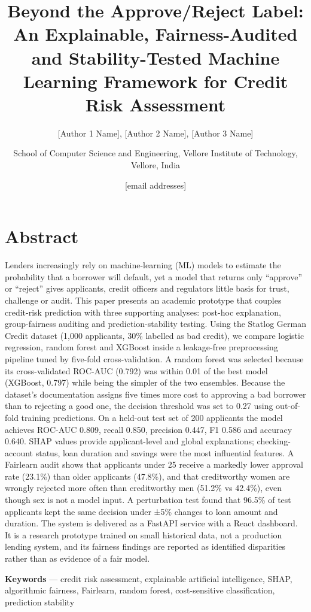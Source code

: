 \documentclass[
  11pt,
]{article}
\title{Beyond the Approve/Reject Label: An Explainable, Fairness-Audited
and Stability-Tested Machine Learning Framework for Credit Risk
Assessment}
\author{{[}Author 1 Name{]}, {[}Author 2 Name{]}, {[}Author 3
Name{]} \and School of Computer Science and Engineering, Vellore
Institute of Technology, Vellore, India \and {[}email addresses{]}}
\date{}
\begin{document}
\maketitle

\hypertarget{abstract}{%
\section{Abstract}\label{abstract}}

Lenders increasingly rely on machine-learning (ML) models to estimate
the probability that a borrower will default, yet a model that returns
only ``approve'' or ``reject'' gives applicants, credit officers and
regulators little basis for trust, challenge or audit. This paper
presents an academic prototype that couples credit-risk prediction with
three supporting analyses: post-hoc explanation, group-fairness auditing
and prediction-stability testing. Using the Statlog German Credit
dataset (1,000 applicants, 30\% labelled as bad credit), we compare
logistic regression, random forest and XGBoost inside a leakage-free
preprocessing pipeline tuned by five-fold cross-validation. A random
forest was selected because its cross-validated ROC-AUC (0.792) was
within 0.01 of the best model (XGBoost, 0.797) while being the simpler
of the two ensembles. Because the dataset's documentation assigns five
times more cost to approving a bad borrower than to rejecting a good
one, the decision threshold was set to 0.27 using out-of-fold training
predictions. On a held-out test set of 200 applicants the model achieves
ROC-AUC 0.809, recall 0.850, precision 0.447, F1 0.586 and accuracy
0.640. SHAP values provide applicant-level and global explanations;
checking-account status, loan duration and savings were the most
influential features. A Fairlearn audit shows that applicants under 25
receive a markedly lower approval rate (23.1\%) than older applicants
(47.8\%), and that creditworthy women are wrongly rejected more often
than creditworthy men (51.2\% vs 42.4\%), even though sex is not a model
input. A perturbation test found that 96.5\% of test applicants kept the
same decision under ±5\% changes to loan amount and duration. The system
is delivered as a FastAPI service with a React dashboard. It is a
research prototype trained on small historical data, not a production
lending system, and its fairness findings are reported as identified
disparities rather than as evidence of a fair model.

\textbf{Keywords} --- credit risk assessment, explainable artificial
intelligence, SHAP, algorithmic fairness, Fairlearn, random forest,
cost-sensitive classification, prediction stability
\end{document}
